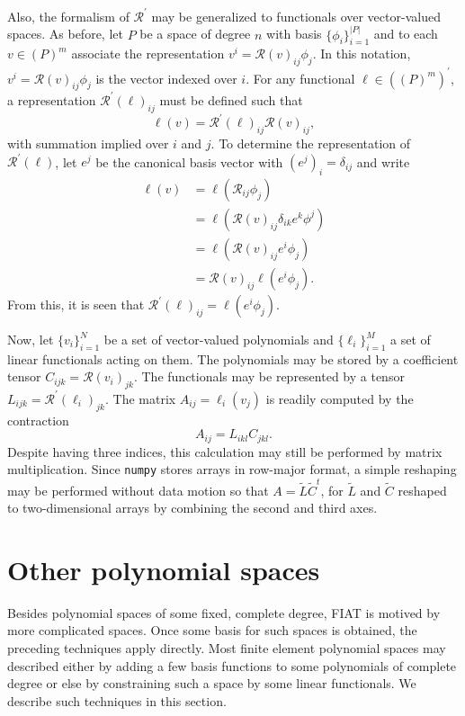 Also, the formalism of \( \mathcal{R}^\prime \) may be generalized
to functionals over vector-valued spaces.  As before, let \( P \)
be a space of degree \( n \) with basis \( \{ \phi_i \}_{i=1}^{|P|}
\) and to each \( v \in (P)^m \) associate the representation \(
v^i = \mathcal{R}(v)_{ij}\phi_j \).  In this notation, \( v^i =
\mathcal{R}(v)_{ij} \phi_j \) is the vector indexed over \( i \).
For any functional \( \ell \in \left( \left(P\right)^m \right)^\prime
\), a representation \( \mathcal{R}^\prime(\ell)_{ij} \) must be defined
such that
\[
\ell(v) = \mathcal{R}^\prime(\ell)_{ij} \mathcal{R}(v)_{ij},
\]
with summation implied over \(i\) and \( j\).  To determine the
representation of \( \mathcal{R}^\prime(\ell) \), let \( e^j \) be the
canonical basis vector with \( (e^j)_i = \delta_{ij} \) and write
\begin{equation}
\begin{split}
\ell(v) & = \ell( \mathcal{R}_{ij}\phi_j ) \\
& = \ell( \mathcal{R}(v)_{ij} \delta_{ik} e^k \phi^j ) \\
& = \ell( \mathcal{R}(v)_{ij} e^i \phi_j ) \\
& = \mathcal{R}(v)_{ij} \ell( e^i \phi_j ).
\end{split}
\end{equation}
From this, it is seen that \( \mathcal{R}^\prime(\ell)_{ij} = \ell(
e^i \phi_j ) \).

Now, let \( \{ v_i \}_{i=1}^N \) be a set of vector-valued polynomials
and \( \{ \ell_i \}_{i=1}^M \) a set of linear functionals acting on
them.  The polynomials may be stored by a coefficient tensor \( C_{ijk}
= \mathcal{R}(v_i)_{jk} \).  The functionals may be represented by a
tensor \( L_{ijk} = \mathcal{R}^\prime(\ell_i)_{jk} \).  The matrix \(
A_{ij} = \ell_i(v_j) \) is readily computed by the contraction
\[
A_{ij} = L_{ikl} C_{jkl}.
\]
Despite having three indices, this calculation may still be performed by
matrix multiplication.  Since \texttt{numpy} stores arrays in row-major
format, a simple reshaping may be performed without data motion so that
\( A = \tilde{L} \tilde{C}^t \), for \( \tilde{L} \) and \( \tilde{C} \)
reshaped to two-dimensional arrays by combining the second and third axes.


\section{Other polynomial spaces}

Besides polynomial spaces of some fixed, complete degree, FIAT is motived
by more complicated spaces.  Once some basis for such spaces is obtained,
the preceding techniques apply directly.  Most finite element polynomial
spaces may described either by adding a few basis functions to some
polynomials of complete degree or else by constraining such a space by
some linear functionals.  We describe such techniques in this section.

